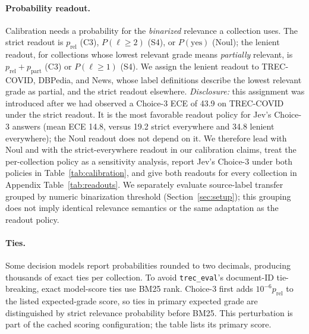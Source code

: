\paragraph{Probability readout.}
Calibration needs a probability for the \emph{binarized} relevance a collection uses.
The strict readout is $p_\text{rel}$ (C3), $P(\ell\ge2)$ (S4), or $P(\text{yes})$ (Noul); the lenient readout, for collections whose lowest relevant grade means \emph{partially} relevant, is $p_\text{rel}+p_\text{part}$ (C3) or $P(\ell\ge1)$ (S4).
We assign the lenient readout to TREC-COVID, DBPedia, and News, whose label definitions describe the lowest relevant grade as partial, and the strict readout elsewhere.
\emph{Disclosure:} this assignment was introduced after we had observed a Choice-3 ECE of 43.9 on TREC-COVID under the strict readout. It is the most favorable readout policy for Jev's Choice-3 answers (mean ECE 14.8, versus 19.2 strict everywhere and 34.8 lenient everywhere); the Noul readout does not depend on it. We therefore lead with Noul and with the strict-everywhere readout in our calibration claims, treat the per-collection policy as a sensitivity analysis, report Jev's Choice-3 under both policies in Table~\ref{tab:calibration}, and give both readouts for every collection in Appendix Table~\ref{tab:readouts}. We separately evaluate source-label transfer grouped by numeric binarization threshold (Section~\ref{sec:setup}); this grouping does not imply identical relevance semantics or the same adaptation as the readout policy.

\paragraph{Ties.}
Some decision models report probabilities rounded to two decimals, producing thousands of exact ties per collection.
To avoid \texttt{trec\_eval}'s document-ID tie-breaking, exact model-score ties use BM25 rank. Choice-3 first adds $10^{-6}p_{\mathrm{rel}}$ to the listed expected-grade score, so ties in primary expected grade are distinguished by strict relevance probability before BM25. This perturbation is part of the cached scoring configuration; the table lists its primary score.
